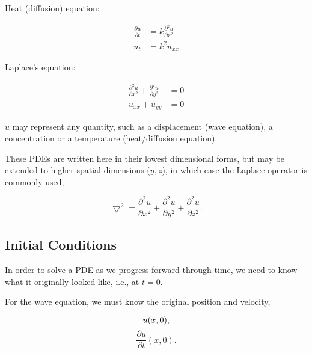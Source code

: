 \documentclass[12pt]{article}
\begin{document}
\hspace{8mm} Heat (diffusion) equation:

\begin{align*}
\frac{\partial u}{\partial t} &= k \frac{\partial^2u}{\partial x^2}  \\[0.8em]
u_{t} &= k^2u_{xx}
\end{align*}

\hspace{8mm} Laplace's equation:

\begin{align*}
\frac{\partial^2u}{\partial x^2} + \frac{\partial^2u}{\partial y^2} &= 0  \\[0.8em]
u_{xx} + u_{yy} &= 0
\end{align*}

\vspace{4mm}

$u$ may represent any quantity, such as a displacement (wave equation), a concentration or a temperature (heat/diffusion equation).

\vspace{4mm}

These PDEs are written here in their lowest dimensional forms, but may be extended to higher spatial dimensions ($y,z$), in which case the Laplace operator is commonly used,

\vspace{2mm}

$$ \bigtriangledown^2 = \frac{\partial^2u}{\partial x^2} + \frac{\partial^2u}{\partial y^2} + \frac{\partial^2u}{\partial z^2}. $$

\newpage

\subsection{Initial Conditions}

In order to solve a PDE as we progress forward through time, we need to know what it originally looked like, i.e., at $t=0$.

\vspace{4mm}

For the wave equation, we must know the original position and velocity,

\vspace{2mm}

$$ u(x,0), \\[1em]$$
$$ \frac{\partial u}{\partial t}(x,0). $$

\vspace{4mm}
\end{document}
